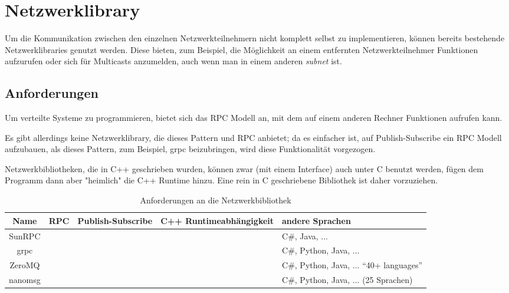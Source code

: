 \clearpage
\section{Netzwerklibrary}
Um die Kommunikation zwischen den einzelnen Netzwerkteilnehmern nicht komplett selbst zu implementieren, k{\"{o}}nnen bereits bestehende Netzwerklibraries genutzt werden.
Diese bieten, zum Beispiel, die M{\"{o}}glichkeit an einem entfernten Netzwerkteilnehmer Funktionen aufzurufen oder sich f{\"{u}}r Multicasts anzumelden, auch wenn man in einem anderen
\textit{subnet} ist.

\subsection{Anforderungen}
Um verteilte Systeme zu programmieren, bietet sich das RPC Modell an, mit dem auf einem anderen Rechner Funktionen aufrufen kann.

Es gibt allerdings keine Netzwerklibrary, die dieses Pattern und RPC anbietet; da es einfacher ist, auf Publish-Subscribe ein RPC Modell aufzubauen, als dieses Pattern, zum Beispiel, grpc beizubringen, wird
diese Funktionalit{\"{a}}t vorgezogen.

Netzwerkbibliotheken, die in C++ geschrieben wurden, k{\"{o}}nnen zwar (mit einem Interface) auch unter C benutzt werden, f{\"{u}}gen dem Programm
dann aber "heimlich" die C++ Runtime hinzu. Eine rein in C geschriebene Bibliothek ist daher vorzuziehen.

\clearpage %
\begin{table}[h]
\centering
\begin{tabu}{c | c | c | c | p{5cm}}
	\toprule
	Name & RPC & Publish-Subscribe & C++ Runtimeabh{\"{a}}ngigkeit & andere Sprachen \\
	\midrule
	SunRPC & \checkmark & \xmark & \checkmark & C\#, Java, ... \\
	grpc\cite{grpc} & \checkmark & \xmark & \xmark & C\#, Python, Java, ... \\
	ZeroMQ\cite{zeromq} & \xmark & \checkmark & \xmark & C\#, Python, Java, ... \enquote{40+ languages} \\
	nanomsg\cite{nanomsg} & \xmark & \checkmark & \checkmark & C\#, Python, Java, ... (25 Sprachen) \\
	\bottomrule
\end{tabu}
\caption{Anforderungen an die Netzwerkbibliothek}
\end{table}

